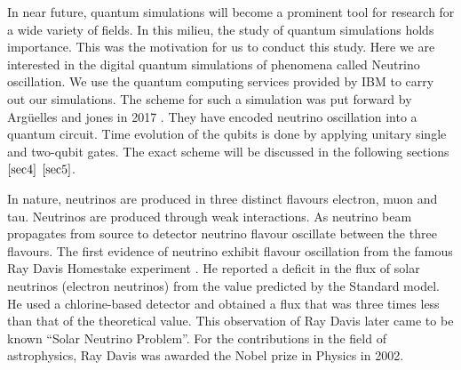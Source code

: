 \documentclass[12pt,a4paper]{report}
\begin{document}
In near future, quantum simulations will become a prominent tool for research for a wide variety of fields. In this milieu, the study of quantum simulations holds importance. This was the motivation for us to conduct this study. Here we are interested in the digital quantum simulations of phenomena called Neutrino oscillation. We use the quantum computing services provided by IBM to carry out our simulations. The scheme for such a simulation was put forward by Arg\"uelles and jones in 2017 \cite{jones}. They have encoded neutrino oscillation into a quantum circuit. Time evolution of the qubits is done by applying unitary single and two-qubit gates. The exact scheme will be discussed in the following sections $\ref{sec4}$ $\ref{sec5}$. 

In nature, neutrinos are produced in three distinct flavours electron, muon and tau. Neutrinos are produced through weak interactions. As neutrino beam propagates from source to detector neutrino flavour oscillate between the three flavours. The first evidence of neutrino exhibit flavour oscillation from the famous Ray Davis Homestake experiment \cite{ray}.  He reported a deficit in the flux of solar neutrinos (electron neutrinos)  from the value predicted by the Standard model. He used a chlorine-based detector and obtained a flux that was three times less than that of the theoretical value.  This observation of Ray Davis later came to be known “Solar Neutrino Problem”. For the contributions in the field of astrophysics, Ray Davis was awarded the Nobel prize in Physics in 2002. 
\end{document}
